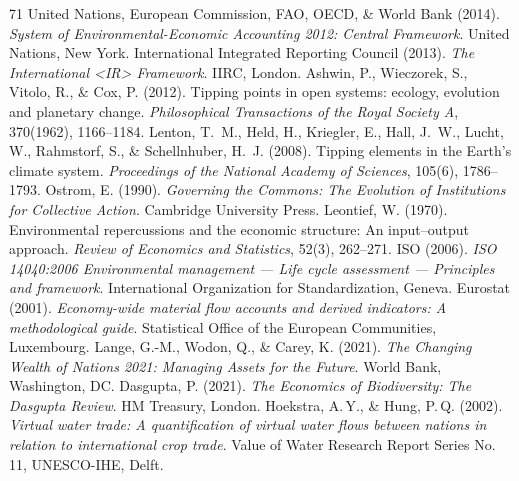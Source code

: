 \documentclass[twocolumn,10pt]{article}
\begin{document}
\begin{thebibliography}{71}
 United Nations, European Commission, FAO, OECD, \& World Bank (2014). \textit{System of Environmental-Economic Accounting 2012: Central Framework}. United Nations, New York.
 International Integrated Reporting Council (2013). \textit{The International <IR> Framework}. IIRC, London.
 Ashwin, P., Wieczorek, S., Vitolo, R., \& Cox, P. (2012). Tipping points in open systems: ecology, evolution and planetary change. \textit{Philosophical Transactions of the Royal Society A}, 370(1962), 1166--1184.
 Lenton, T.~M., Held, H., Kriegler, E., Hall, J.~W., Lucht, W., Rahmstorf, S., \& Schellnhuber, H.~J. (2008). Tipping elements in the Earth's climate system. \textit{Proceedings of the National Academy of Sciences}, 105(6), 1786--1793.
 Ostrom, E. (1990). \textit{Governing the Commons: The Evolution of Institutions for Collective Action}. Cambridge University Press.
 Leontief, W. (1970). Environmental repercussions and the economic structure: An input--output approach. \textit{Review of Economics and Statistics}, 52(3), 262--271.
 ISO (2006). \textit{ISO 14040:2006 Environmental management --- Life cycle assessment --- Principles and framework}. International Organization for Standardization, Geneva.
 Eurostat (2001). \textit{Economy-wide material flow accounts and derived indicators: A methodological guide}. Statistical Office of the European Communities, Luxembourg.
 Lange, G.-M., Wodon, Q., \& Carey, K. (2021). \textit{The Changing Wealth of Nations 2021: Managing Assets for the Future}. World Bank, Washington, DC.
 Dasgupta, P. (2021). \textit{The Economics of Biodiversity: The Dasgupta Review}. HM Treasury, London.
 Hoekstra, A.\,Y., \& Hung, P.\,Q. (2002). \textit{Virtual water trade: A quantification of virtual water flows between nations in relation to international crop trade}. Value of Water Research Report Series No. 11, UNESCO-IHE, Delft.


\end{thebibliography}
\end{document}
